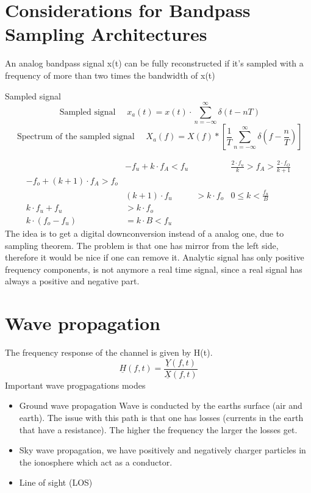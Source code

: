 \section{Considerations for Bandpass Sampling Architectures}
An analog bandpass signal x(t) can be fully reconstructed if it's sampled with a frequency of more than two times the bandwidth of x(t)

Sampled signal
$$
\text { Sampled signal } \quad x_a(t)=x(t) \cdot \sum_{n=-\infty}^{\infty} \delta(t-n T)
$$
$$
\text { Spectrum of the sampled signal } \quad X_a(f)=X(f) *\left[\frac{1}{T} \sum_{n=-\infty}^{\infty} \delta\left(f-\frac{n}{T}\right)\right]
$$

$$
\begin{array}{rlrl} 
& -f_u+k \cdot f_A<f_u & & \frac{2 \cdot f_u}{k}>f_A>\frac{2 \cdot f_O}{k+1} \\
-f_o+(k+1) \cdot f_A>f_o & & \\
& (k+1) \cdot f_u & >k \cdot f_o & 0 \leq k<\frac{f_u}{B} \\
k \cdot f_u+f_u & >k \cdot f_o & & \\
k \cdot\left(f_o-f_u\right) & =k \cdot B<f_u & &
\end{array}
$$
The idea is to get a digital downconversion instead of a analog one, due to sampling theorem.
The problem is that one has mirror from the left side, therefore it would be nice if one can remove it.
Analytic signal has only positive frequency components, is not anymore a real time signal, since a real signal has always a positive and negative part.
\section{Wave propagation}
The frequency response of the channel is given by H(t).
\begin{equation}
\underline{H}(f, t)=\frac{\underline{Y}(f, t)}{\underline{X}(f, t)}
\end{equation}
Important wave progpagations modes
\begin{itemize}
    \item Ground wave propagation\newline
    Wave is conducted by the earths surface (air and earth). The issue with this path is that one has losses (currents in the earth that have a resistance). The higher the frequency the larger the losses get.
    \item Sky wave propagation, we have positively and negatively charger particles in the ionosphere which act as a conductor.
    \item Line of sight (LOS)
\end{itemize}
